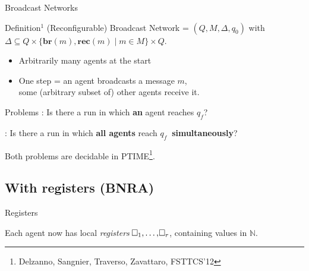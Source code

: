 \documentclass{beamer}
\newcommand{\reg}{\hspace{-0.5mm}\square}
\begin{document}
\begin{frame}{Broadcast Networks}
	\begin{block}{Definition$^1$}
		(Reconfigurable) Broadcast Network = $(Q, M, \Delta, q_0)$ with $\Delta \subseteq Q\times \{\mathbf{br}(m), \mathbf{rec}(m) \mid m \in M\} \times Q$.
	\end{block}
	
	\pause
	
	\begin{itemize}
		\item Arbitrarily many agents at the start
		
		\item One step = an agent broadcasts a message $m$,\\ some (arbitrary subset of) other agents receive it.
	\end{itemize}
	
	\pause 
	
	\begin{block}{Problems}
		{}: Is there a run in which \textbf{an} agent reaches \color{blue!60}$q_f$\color{black}?
		
		{}: Is there a run in which \textbf{all agents} reach \color{blue!60}$q_f~$\color{black} \textbf{simultaneously}?
	\end{block}
	
	Both problems are decidable in PTIME\footnote{Delzanno, Sangnier, Traverso, Zavattaro, FSTTCS'12}.
\end{frame}

\subsection{With registers (BNRA)}

\begin{frame}
	\tableofcontents[currentsubsection]
\end{frame}

\begin{frame}{Registers}
	
	Each agent now has local \emph{registers} $\reg_1, \ldots, \reg_r$, containing values in $\mathbb{N}$.\vspace{0.3cm}\pause
	
	
\end{frame}
\end{document}
